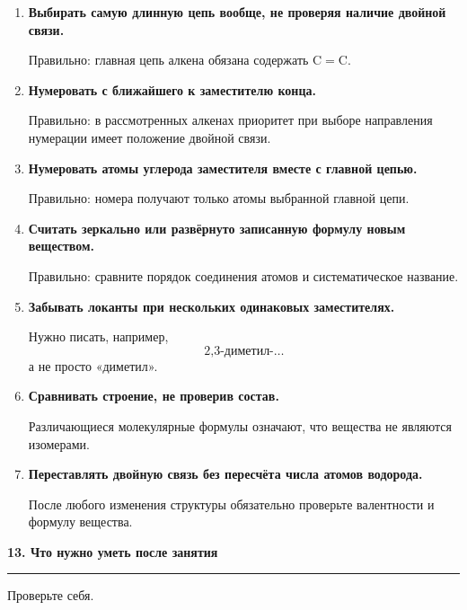 \documentclass[a4paper,12pt]{article}
\newcommand{\lessonsection}[1]{%
    \vspace{0.7em}
    {\Large\bfseries\color{darkaccent}#1}\par
    \vspace{0.15em}
    {\color{linegray}\rule{\linewidth}{0.7pt}}
    \vspace{0.35em}
}
\newcommand{\warning}[1]{\textbf{\color{warn}#1}}
\begin{document}
\begin{enumerate}
    \item \warning{Выбирать самую длинную цепь вообще, не проверяя наличие двойной связи.}

    Правильно: главная цепь алкена обязана содержать \(\mathrm{C=C}\).

    \item \warning{Нумеровать с ближайшего к заместителю конца.}

    Правильно: в рассмотренных алкенах приоритет при выборе направления нумерации имеет положение двойной связи.

    \item \warning{Нумеровать атомы углерода заместителя вместе с главной цепью.}

    Правильно: номера получают только атомы выбранной главной цепи.

    \item \warning{Считать зеркально или развёрнуто записанную формулу новым веществом.}

    Правильно: сравните порядок соединения атомов и систематическое название.

    \item \warning{Забывать локанты при нескольких одинаковых заместителях.}

    Нужно писать, например,
    \[
    \text{2,3-диметил-}\ldots
    \]
    а не просто «диметил».

    \item \warning{Сравнивать строение, не проверив состав.}

    Различающиеся молекулярные формулы означают, что вещества не являются изомерами.

    \item \warning{Переставлять двойную связь без пересчёта числа атомов водорода.}

    После любого изменения структуры обязательно проверьте валентности и формулу вещества.
\end{enumerate}


\lessonsection{13. Что нужно уметь после занятия}

Проверьте себя.
\end{document}
